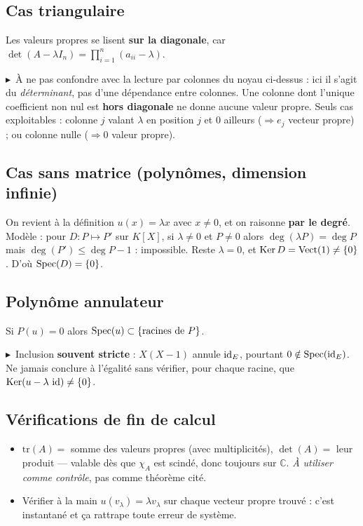 \documentclass[10pt]{article}
\newcommand{\piege}{$\blacktriangleright$\ }
\begin{document}
\subsection{Cas triangulaire}

Les valeurs propres se lisent \textbf{sur la diagonale}, car
$\det(A-\lambda I_n)=\prod_{i=1}^n (a_{ii}-\lambda)$.

\piege À ne pas confondre avec la lecture par colonnes du noyau ci-dessus : ici il s'agit du
\emph{déterminant}, pas d'une dépendance entre colonnes. Une colonne dont l'unique coefficient non nul
est \textbf{hors diagonale} ne donne aucune valeur propre. Seuls cas exploitables :
colonne $j$ valant $\lambda$ en position $j$ et $0$ ailleurs ($\Rightarrow e_j$ vecteur propre) ;
ou colonne nulle ($\Rightarrow 0$ valeur propre).

\subsection{Cas sans matrice (polynômes, dimension infinie)}

On revient à la définition $u(x)=\lambda x$ avec $x\neq 0$, et on raisonne \textbf{par le degré}.
Modèle : pour $D:P\mapsto P'$ sur $K[X]$, si $\lambda\neq0$ et $P\neq0$ alors $\deg(\lambda P)=\deg P$
mais $\deg(P')\leq \deg P-1$ : impossible. Reste $\lambda=0$, et $\operatorname{Ker} D=\operatorname{Vect}(1)\neq\{0\}$.
D'où $\operatorname{Spec}(D)=\{0\}$.

\subsection{Polynôme annulateur}

Si $P(u)=0$ alors $\operatorname{Spec}(u)\subset\{\text{racines de }P\}$.

\piege Inclusion \textbf{souvent stricte} : $X(X-1)$ annule $\operatorname{id}_E$, pourtant $0\notin\operatorname{Spec}(\operatorname{id}_E)$.
Ne jamais conclure à l'égalité sans vérifier, pour chaque racine, que $\operatorname{Ker}(u-\lambda\,\operatorname{id})\neq\{0\}$.

\subsection{Vérifications de fin de calcul}

\begin{itemize}
\item $\mathrm{tr}(A) = $ somme des valeurs propres (avec multiplicités), $\det(A)=$ leur produit
--- valable dès que $\chi_A$ est scindé, donc toujours sur $\mathbb{C}$.
\emph{À utiliser comme contrôle}, pas comme théorème cité.
\item Vérifier à la main $u(v_\lambda)=\lambda v_\lambda$ sur chaque vecteur propre trouvé : c'est
instantané et ça rattrape toute erreur de système.
\end{itemize}
\end{document}
